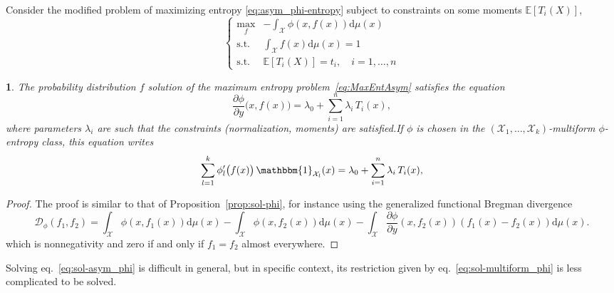 \documentclass[english,sort&compress]{elsarticle}
\theoremstyle{definition}
\theoremstyle{plain}
\newtheorem{prop}{\protect\propositionname}
\theoremstyle{plain}
\providecommand{\propositionname}{Proposition}
\def\dmu{\mathrm{d}\mu}
\def\fD{\mathcal{D}}
\def\X{\mathcal{X}}
\def\un{\mathbbm{1}}
\newcommand{\Esp}[1]{\mathbb{E}\left[ #1 \right]}
\begin{document}
\

Consider the modified  problem of maximizing entropy \eqref{eq:asym_phi-entropy}
subject to constraints on some moments $\Esp{T_i(X)}$,
%
\begin{equation}\label{eq:MaxEntAsym}
\begin{cases}
\max_f & {\displaystyle - \int_\X \phi(x,f(x)) \dmu(x)}\\[5mm]
\text{s.t. } & {\displaystyle \int_\X f(x) \dmu(x) = 1}\\[5mm]
\text{s.t. } & \Esp{T_i(X)} = t_i, \quad i = 1 , \ldots , n
\end{cases}
\end{equation}

\begin{prop}\label{prop:sol-asym_phi}
  The   probability   distribution  $f$   solution   of   the  maximum   entropy
  problem~\eqref{eq:MaxEntAsym} satisfies the equation
  \begin{equation}\label{eq:sol-asym_phi}
  \frac{\partial \phi}{\partial y}\big(x,f(x)\big) = \lambda_0 + \sum_{i=1}^n
  \lambda_i \, T_i(x),
  \end{equation}
  where  parameters $\lambda_i$  are such  that the  constraints (normalization,
  moments) are satisfied.\newline  If $\phi$ is chosen in the  $(\X_1 , \ldots ,
  \X_k)$-multiform $\phi$-entropy class, this equation writes
  \begin{equation}\label{eq:sol-multiform_phi}
  \sum_{l=1}^k \phi_l'\big(f(x)\big) \, \un_{\X_l}(x) = \lambda_0 +
  \sum_{i=1}^n \lambda_i \, T_i(x),
  \end{equation}
\end{prop}
%
\begin{proof}
  The proof is similar to that of Proposition~\ref{prop:sol-phi}, for instance
  using the generalized functional Bregman divergence
  \[
  \fD_\phi(f_1,f_2)  = \int_\X \phi(x,f_1(x))  \dmu(x) -  \int_\X \phi(x,f_2(x))
  \dmu(x) -  \int_\X \frac{\partial \phi}{\partial y}(x,f_2(x))  \left( f_1(x) -
    f_2(x) \right) \dmu(x).
  \]
  which is nonnegativity and zero if and only if $f_1 = f_2$ almost everywhere.
\end{proof}

Solving eq.~\eqref{eq:sol-asym_phi}  is difficult  in general, but  in specific
context,  its  restriction given  by  eq.~\eqref{eq:sol-multiform_phi} is  less
complicated to be solved.


\end{document}
